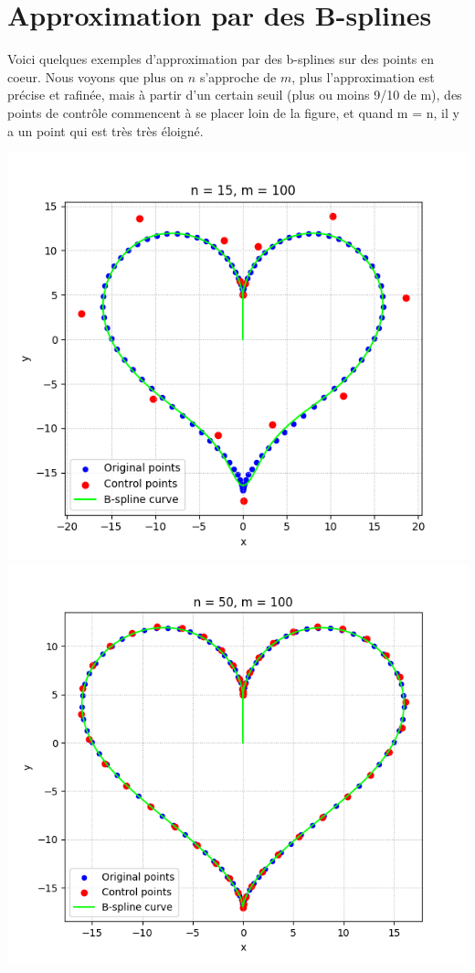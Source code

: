 \documentclass[11pt]{article}
\begin{document}
\section{Approximation par des B-splines}

Voici quelques exemples d'approximation par des b-splines sur des points en coeur. Nous voyons que plus on $n$ s'approche de $m$, plus l'approximation est précise et rafinée, mais à partir d'un certain seuil (plus ou moins 9/10 de m), des points de contrôle commencent à se placer loin de la figure, et quand m = n, il y a un point qui est très très éloigné.

\includegraphics[scale=0.32]{images/coeur1.png}
\includegraphics[scale=0.31]{images/coeur2.png}
\end{document}
